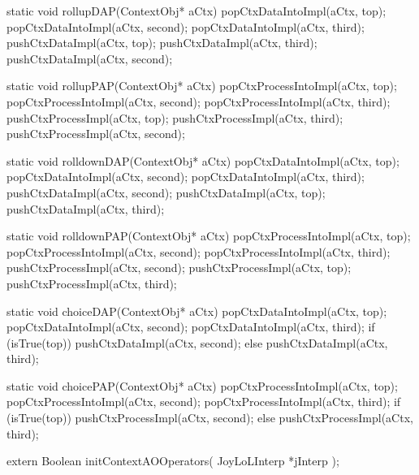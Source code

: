 \startCCode
static void rollupDAP(ContextObj* aCtx) {
  popCtxDataIntoImpl(aCtx, top);
  popCtxDataIntoImpl(aCtx, second);
  popCtxDataIntoImpl(aCtx, third);
  pushCtxDataImpl(aCtx, top);
  pushCtxDataImpl(aCtx, third);
  pushCtxDataImpl(aCtx, second);
}
\stopCCode

\startCCode
static void rollupPAP(ContextObj* aCtx) {
  popCtxProcessIntoImpl(aCtx, top);
  popCtxProcessIntoImpl(aCtx, second);
  popCtxProcessIntoImpl(aCtx, third);
  pushCtxProcessImpl(aCtx, top);
  pushCtxProcessImpl(aCtx, third);
  pushCtxProcessImpl(aCtx, second);
}
\stopCCode

\startCCode
static void rolldownDAP(ContextObj* aCtx) {
  popCtxDataIntoImpl(aCtx, top);
  popCtxDataIntoImpl(aCtx, second);
  popCtxDataIntoImpl(aCtx, third);
  pushCtxDataImpl(aCtx, second);
  pushCtxDataImpl(aCtx, top);
  pushCtxDataImpl(aCtx, third);
}
\stopCCode

\startCCode
static void rolldownPAP(ContextObj* aCtx) {
  popCtxProcessIntoImpl(aCtx, top);
  popCtxProcessIntoImpl(aCtx, second);
  popCtxProcessIntoImpl(aCtx, third);
  pushCtxProcessImpl(aCtx, second);
  pushCtxProcessImpl(aCtx, top);
  pushCtxProcessImpl(aCtx, third);
}
\stopCCode

\startCCode
static void choiceDAP(ContextObj* aCtx) {
  popCtxDataIntoImpl(aCtx, top);
  popCtxDataIntoImpl(aCtx, second);
  popCtxDataIntoImpl(aCtx, third);
  if (isTrue(top)) {
    pushCtxDataImpl(aCtx, second);
  } else {
    pushCtxDataImpl(aCtx, third);
  }
}
\stopCCode

\startCCode
static void choicePAP(ContextObj* aCtx) {
  popCtxProcessIntoImpl(aCtx, top);
  popCtxProcessIntoImpl(aCtx, second);
  popCtxProcessIntoImpl(aCtx, third);
  if (isTrue(top)) {
    pushCtxProcessImpl(aCtx, second);
  } else {
    pushCtxProcessImpl(aCtx, third);
  }
}
\stopCCode


\startCHeader
extern Boolean initContextAOOperators(
  JoyLoLInterp *jInterp
);
\stopCHeader
{}

